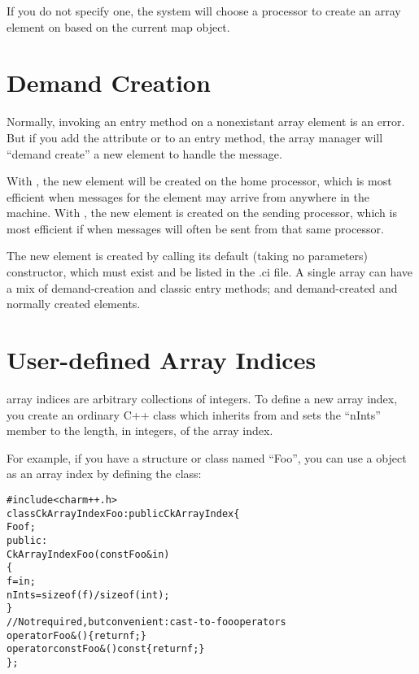 If you do not specify one, the system will choose a processor to 
create an array element on based on the current map object.



\section{Demand Creation}

Normally, invoking an entry method on a nonexistant array
element is an error.  But if you add the attribute
 
\kw{[createhere]} or \kw{[createhome]} to an entry method,
 the array manager will 
``demand create'' a new element to handle the message.  

With \kw{[createhome]}, the new element
will be created on the home processor, which is most efficient when messages for
the element may arrive from anywhere in the machine. With \kw{[createhere]},
the new element is created on the sending processor, which is most efficient
if when messages will often be sent from that same processor.

The new element is created by calling its default (taking no
parameters) constructor, which must exist and be listed in the .ci file.
A single array can have a mix of demand-creation and
classic entry methods; and demand-created and normally 
created elements.



\section{User-defined Array Indices}
\label{user-defined array index type}

\charmpp{} array indices are arbitrary collections of integers.
To define a new array index, you create an ordinary C++ class 
which inherits from  and sets the ``nInts'' member
to the length, in integers, of the array index.

For example, if you have a structure or class named ``Foo'', you 
can use a  object as an array index by defining the class:

\begin{alltt}
#include <charm++.h>
class CkArrayIndexFoo:public CkArrayIndex \{
    Foo f;
public:
    CkArrayIndexFoo(const Foo \&in) 
    \{
        f=in;
        nInts=sizeof(f)/sizeof(int);
    \}
    //Not required, but convenient: cast-to-foo operators
    operator Foo &() \{return f;\}
    operator const Foo &() const \{return f;\}
\};
\end{alltt}

